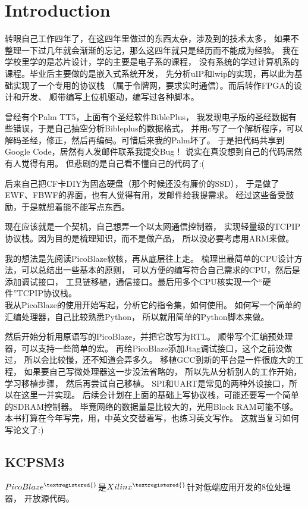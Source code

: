 \chapter{Introduction}
转眼自己工作四年了，在这四年里做过的东西太杂，涉及到的技术太多，
如果不整理一下过几年就会渐渐的忘记，那么这四年就只是经历而不能成为经验。
我在学校里学的是芯片设计，学的主要是电子系的课程，
没有系统的学过计算机系的课程。毕业后主要做的是嵌入式系统开发，
先分析uIP和lwip的实现，再以此为基础实现了一个专用的协议栈
（属于令牌网，要求实时通信）。而后转作FPGA的设计和开发、
顺带编写上位机驱动，编写过各种脚本。

曾经有个Palm TT5，上面有个圣经软件BiblePlus，
我发现电子版的圣经数据有些错误，于是自己抽空分析Bibleplus的数据格式，
并用c写了一个解析程序，可以解码圣经，修正，然后再编码。可惜后来我的Palm坏了。
于是把代码共享到Google Code，居然有人发邮件联系我提交Bug！
说实在真没想到自己的代码居然有人觉得有用。
但悲剧的是自己看不懂自己的代码了:(

后来自己把CF卡DIY为固态硬盘（那个时候还没有廉价的SSD），
于是做了EWF、FBWF的界面，也有人觉得有用，发邮件给我提需求。
经过这些备受鼓励，于是就想着能不能写点东西。

现在应该就是一个契机，自己想弄一个以太网通信控制器，
实现轻量级的TCPIP协议栈。因为目的是梳理知识，而不是做产品，
所以没必要考虑用ARM来做。

我的想法是先阅读PicoBlaze软核，再从底层往上走。
梳理出最简单的CPU设计方法，可以总结出一些基本的原则，
可以方便的编写符合自己需求的CPU，然后是添加调试接口，
工具链移植，通信接口。最后用多个CPU核实现一个“硬件”TCPIP协议栈。
\\

我从PicoBlaze的使用开始写起，分析它的指令集，如何使用。
如何写一个简单的汇编处理器，自己比较熟悉Python，
所以就用简单的Python脚本来做。

然后开始分析用原语写的PicoBlaze，并把它改写为RTL。
顺带写个汇编预处理器，可以支持一些简单的宏。
再给PicoBlaze添加Jtag调试接口，这个之前没做过，
所以会比较慢，还不知道会弄多久。
移植GCC到新的平台是一件很庞大的工程，
如果要自己写微处理器这一步没法省略的，
所以先从分析别人的工作开始，学习移植步骤，
然后再尝试自己移植。
SPI和UART是常见的两种外设接口，所以在这里一并实现。
后续会计划在上面的基础上写协议栈，可能还要写一个简单的SDRAM控制器。
毕竟网络的数据量是比较大的，光用Block RAM可能不够。
\\

本书打算在今年写完，用，中英文交替着写，也练习英文写作。
这就当复习如何写论文了:)

\clearpage
\section{KCPSM3}
$PicoBlaze^{\textregistered{}}$是$Xilinx^{\textregistered{}}$针对低端应用开发的8位处理器，
开放源代码。

